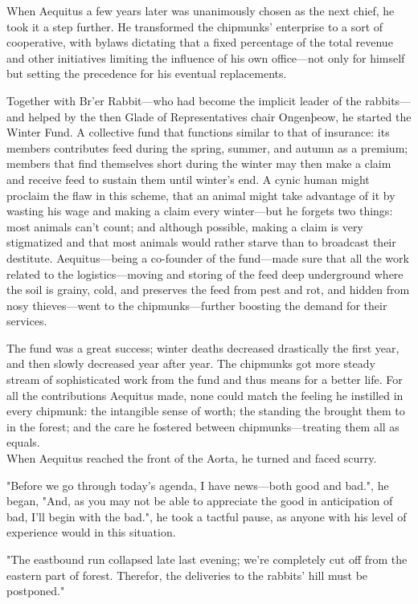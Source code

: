 When Aequitus a few years later was unanimously chosen as the next chief, he took it a step further. He transformed the chipmunks' enterprise to a sort of cooperative, with bylaws dictating that a fixed percentage of the total revenue and other initiatives limiting the influence of his own office---not only for himself but setting the precedence for his eventual replacements. 

Together with Br'er Rabbit---who had become the implicit leader of the rabbits---and helped by the then Glade of Representatives chair Ongenþeow, he started the Winter Fund. A collective fund that functions similar to that of insurance: its members contributes feed during the spring, summer, and autumn as a premium; members that find themselves short during the winter may then make a claim and receive feed to sustain them until winter's end.
A cynic human might proclaim the flaw in this scheme, that an animal might take advantage of it by wasting his wage and making a claim every winter---but he forgets two things: most animals can't count; and although possible, making a claim is very stigmatized and that most animals would rather starve than to broadcast their destitute. Aequitus---being a co-founder of the fund---made sure that all the work related to the logistics---moving and storing of the feed deep underground where the soil is grainy, cold, and preserves the feed from pest and rot, and hidden from nosy thieves---went to the chipmunks---further boosting the demand for their services.

The fund was a great success; winter deaths decreased drastically the first year, and then slowly decreased year after year. The chipmunks got more steady stream of sophisticated work from the fund and thus means for a better life. For all the contributions Aequitus made, none could match the feeling he instilled in every chipmunk: the intangible sense of worth; the standing the brought them to in the forest; and the care he fostered between chipmunks---treating them all as equals.\\

When Aequitus reached the front of the Aorta, he turned and faced scurry.

"Before we go through today's agenda, I have news---both good and bad.", he began, "And, as you may not be able to appreciate the good in anticipation of bad, I'll begin with the bad.", he took a tactful pause, as anyone with his level of experience would in this situation.

"The eastbound run collapsed late last evening; we're completely cut off from the eastern part of forest. Therefor, the deliveries to the rabbits' hill must be postponed."

